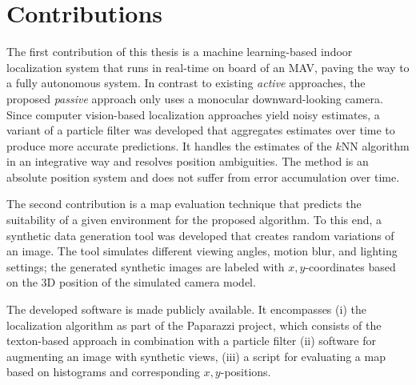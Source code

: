 \section{Contributions}
\label{sec:contributions}

The first contribution of this thesis is a machine learning-based
indoor localization system that runs in real-time on board
of an MAV, paving the way to a fully autonomous system. In contrast to
existing \emph{active} approaches, the proposed \emph{passive}
approach only uses a monocular downward-looking camera. Since
computer vision-based localization approaches yield noisy estimates, a
variant of a particle filter was developed that aggregates estimates
over time to produce more accurate predictions. It handles the
estimates of the $k$NN algorithm in an integrative way and resolves
position ambiguities. The method is an absolute position system and does not suffer from error
accumulation over time.

The second contribution is a map evaluation technique that predicts
the suitability of a given environment for the proposed algorithm. To
this end, a synthetic data generation tool was developed that creates
random variations of an image. The tool simulates different viewing
angles, motion blur, and lighting settings; the generated synthetic
images are labeled with $x,y$-coordinates based on the 3D position of
the simulated camera model.

The developed software is made publicly available. It encompasses (i)
the localization algorithm as part of the Paparazzi project, which
consists of the texton-based approach in combination with a particle
filter (ii) software for augmenting an image with synthetic views,
(iii) a script for evaluating a map based on histograms and
corresponding $x,y$-positions.

